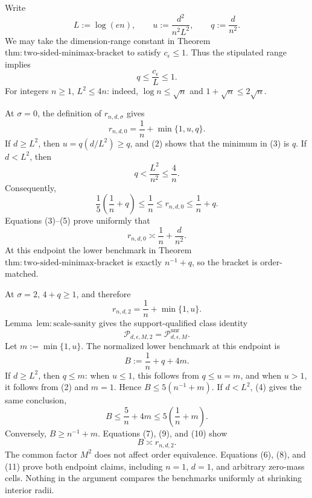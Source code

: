 Write
\[
 L:=\log(en),\qquad
 u:=\frac{d^2}{n^2L^2},\qquad
 q:=\frac d{n^2}.
\tag{1}
\]
We may take the dimension-range constant in Theorem~\(\mathrm{thm:two\text{-}sided\text{-}minimax\text{-}bracket}\) to satisfy \(c_{\epsilon}\le1\).  Thus the stipulated range implies
\[
 q\le\frac{c_{\epsilon}}L\le1.
\tag{2}
\]
For integers \(n\ge1\), \(L^2\le4n\): indeed, \(\log n\le\sqrt n\) and \(1+\sqrt n\le2\sqrt n\).

At \(\sigma=0\), the definition of \(r_{n,d,\sigma}\) gives
\[
 r_{n,d,0}=\frac1n+\min\{1,u,q\}.
\tag{3}
\]
If \(d\ge L^2\), then \(u=q(d/L^2)\ge q\), and (2) shows that the minimum in (3) is \(q\).  If \(d<L^2\), then
\[
 q<\frac{L^2}{n^2}\le\frac4n.
\tag{4}
\]
Consequently,
\[
 \frac15\left(\frac1n+q\right)
 \le \frac1n
 \le r_{n,d,0}
 \le \frac1n+q.
\tag{5}
\]
Equations (3)--(5) prove uniformly that
\[
 r_{n,d,0}\asymp \frac1n+\frac d{n^2}.
\tag{6}
\]
At this endpoint the lower benchmark in Theorem~\(\mathrm{thm:two\text{-}sided\text{-}minimax\text{-}bracket}\) is exactly \(n^{-1}+q\), so the bracket is order-matched.

At \(\sigma=2\), \(4+q\ge1\), and therefore
\[
 r_{n,d,2}=\frac1n+\min\{1,u\}.
\tag{7}
\]
Lemma~\(\mathrm{lem:scale\text{-}sanity}\) gives the support-qualified class identity
\[
 \mathcal P_{d,\epsilon,M,2}=\mathcal P_{d,\epsilon,M}^{\mathrm{unr}}.
\tag{8}
\]
Let \(m:=\min\{1,u\}\).  The normalized lower benchmark at this endpoint is
\[
 B:=\frac1n+q+4m.
\tag{9}
\]
If \(d\ge L^2\), then \(q\le m\): when \(u\le1\), this follows from \(q\le u=m\), and when \(u>1\), it follows from (2) and \(m=1\).  Hence \(B\le5(n^{-1}+m)\).  If \(d<L^2\), (4) gives the same conclusion,
\[
 B\le\frac5n+4m\le5\left(\frac1n+m\right).
\tag{10}
\]
Conversely, \(B\ge n^{-1}+m\).  Equations (7), (9), and (10) show
\[
 B\asymp r_{n,d,2}.
\tag{11}
\]
The common factor \(M^2\) does not affect order equivalence.  Equations (6), (8), and (11) prove both endpoint claims, including \(n=1\), \(d=1\), and arbitrary zero-mass cells.  Nothing in the argument compares the benchmarks uniformly at shrinking interior radii.